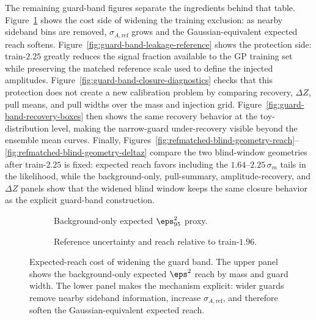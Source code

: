 The remaining guard-band figures separate the ingredients behind that table. Figure~\ref{fig:guard-band-reach-uncertainty} shows the cost side of widening the training exclusion: as nearby sideband bins are removed, $\sigma_{A,\mathrm{ref}}$ grows and the Gaussian-equivalent expected reach softens. Figure~\ref{fig:guard-band-leakage-reference} shows the protection side: train-$2.25$ greatly reduces the signal fraction available to the GP training set while preserving the matched reference scale used to define the injected amplitudes. Figure~\ref{fig:guard-band-closure-diagnostics} checks that this protection does not create a new calibration problem by comparing recovery, $\Delta Z$, pull means, and pull widths over the mass and injection grid. Figure~\ref{fig:guard-band-recovery-boxes} then shows the same recovery behavior at the toy-distribution level, making the narrow-guard under-recovery visible beyond the ensemble mean curves. Finally, Figures~\ref{fig:refmatched-blind-geometry-reach}--\ref{fig:refmatched-blind-geometry-deltaz} compare the two blind-window geometries after train-$2.25$ is fixed: expected reach favors including the $1.64$--$2.25\,\sigma_m$ tails in the likelihood, while the background-only, pull-summary, amplitude-recovery, and $\Delta Z$ panels show that the widened blind window keeps the same closure behavior as the explicit guard-band construction.

\begin{figure}[H]
\centering
\begin{subfigure}[t]{0.82\linewidth}
  \centering
  \caption{Background-only expected $\eps^2_{95}$ proxy.}
\end{subfigure}

\vspace{0.8em}

\begin{subfigure}[t]{0.82\linewidth}
  \centering
  \caption{Reference uncertainty and reach relative to train-$1.96$.}
\end{subfigure}
\caption{Expected-reach cost of widening the guard band. The upper panel shows the
background-only expected $\eps^2$ reach by mass and guard width. The lower panel makes
the mechanism explicit: wider guards remove nearby sideband information, increase
$\sigma_{A,\mathrm{ref}}$, and therefore soften the Gaussian-equivalent expected
reach.}
\label{fig:guard-band-reach-uncertainty}
\end{figure}

